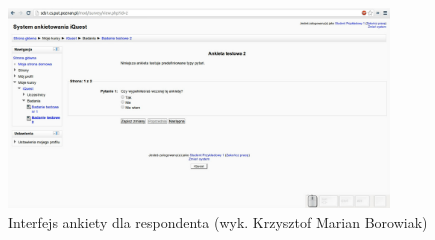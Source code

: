 \begin{figure}[H]
\centering\includegraphics[width=0.9\textwidth]{figures/kb/W2-odpowiadanienanakiete}
\caption{Interfejs ankiety dla respondenta (wyk. Krzysztof Marian Borowiak)}\label{rys:OdpowiadanieNaAnkiete}
\end{figure}